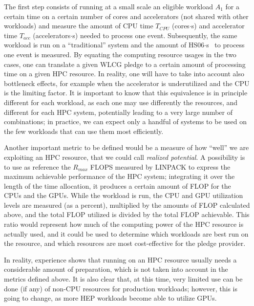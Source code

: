 The first step consists of running at a small scale an eligible
workload $A_1$ for a certain time on a certain number of cores and
accelerators (not shared with other workloads) and measure the amount
of CPU time $T_{CPU}$ (cores$\cdot$s) and accelerator time $T_{acc}$
(accelerators$\cdot$s) needed to process one event. Subsequently, the
same workload is run on a ``traditional'' system and the amount of
HS06$\cdot$s~\cite{hs06} to process one event is measured. By equating
the computing resource usages in the two cases, one can translate a
given WLCG pledge to a certain amount of processing time on a given
HPC resource. In reality, one will have to take into account also
bottleneck effects, for example when the accelerator is underutilized
and the CPU is the limiting factor. It is important to know that this
equivalence is in principle different for each workload, as each one
may use differently the resources, and different for each HPC system,
potentially leading to a very large number of combinations; in
practice, we can expect only a handful of systems to be used on the
few workloads that can use them most efficiently.

Another important metric to be defined would be a measure of how
``well'' we are exploiting an HPC resource, that we could call
\emph{realized potential}. A possibility is to use as reference the
$R_{max}$ FLOPS measured by LINPACK to express the
maximum achievable performance of the HPC system; integrating it over
the length of the time allocation, it produces a certain amount of
FLOP for the CPUs and the GPUs. While the workload is run, the CPU and
GPU utilization levels are measured (as a percent), multiplied by the
amounts of FLOP calculated above, and the total FLOP utilized is
divided by the total FLOP achievable. This ratio would represent how
much of the computing power of the HPC resource is actually used, and
it could be used to determine which workloads are best run on the
resource, and which resources are most cost-effective for the pledge
provider.

In reality, experience shows that running on an HPC resource usually
needs a considerable amount of preparation, which is not taken into
account in the metrics defined above. It is also clear that, at this
time, very limited use can be done (if any) of non-CPU resources for
production workloads; however, this is going to change, as more HEP
workloads become able to utilize GPUs.
